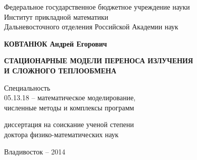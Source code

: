 \documentclass[14pt,oneside]{extbook}
\renewcommand{\theequation}{\arabic{chapter}.\arabic{equation}}
\begin{document}
\begin{titlepage}
\begin{center}
Федеральное государственное бюджетное учреждение науки\\
Институт прикладной математики\\
Дальневосточного отделения Российской Академии наук


\end{center}
\vspace{1cm}  \vspace{2cm}
\begin{center}
{\bf КОВТАНЮК Андрей Егорович} \vspace{1.5cm}

{\bf СТАЦИОНАРНЫЕ МОДЕЛИ ПЕРЕНОСА ИЗЛУЧЕНИЯ\\ И СЛОЖНОГО
ТЕПЛООБМЕНА} \vspace{2cm}


Специальность \\ 05.13.18 -- математическое моделирование,\\
численные методы и комплексы программ \vspace{1cm}


диссертация на соискание ученой  степени \\
доктора физико-математических наук

\vspace{1.5cm}
\end{center}

\vspace{2cm}
\begin{center}
Владивосток -- 2014

\end{center}


\end{titlepage}
\setcounter{page}{2}

\tableofcontents




\renewcommand{\theequation}{\arabic{chapter}.\arabic{equation}}






\def\bibname{\cyr Список цитируемой литературы}

\end{document}

